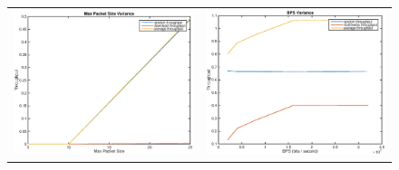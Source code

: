 \begin{figure}
\begin{tabular}{cc}
\includegraphics[scale=0.35]{../../src/fig-simulation_random_download-maxpackets-1_0_5_0_1_1_25.eps} & \includegraphics[scale=0.35]{../../src/fig-simulation_random_multimedia-bps-1_0_1_0_12000.eps} \\

\end{tabular}
\end{figure}

